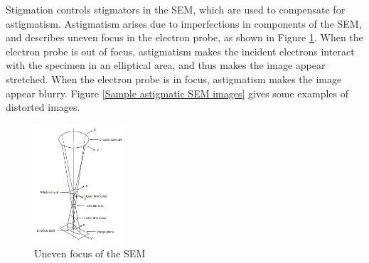 \documentclass{article}
\begin{document}
Stigmation controls stigmators in the SEM, which are used to compensate for astigmatism. Astigmatism arises due to imperfections in components of the SEM, and describes uneven focus in the electron probe, as shown in Figure \ref{SEM uneven focus}. When the electron probe is out of focus, astigmatism makes the incident electrons interact with the specimen in an elliptical area, and thus makes the image appear stretched. When the electron probe is in focus, astigmatism makes the image appear blurry. Figure \ref{Sample astigmatic SEM images} gives some examples of distorted images.

\begin{figure}
    \centering
    \includegraphics[width=0.3\textwidth]{Images/SEM uneven focus.jpg}
    \caption{Uneven focus of the SEM}
    \label{SEM uneven focus}
\end{figure}
\end{document}
